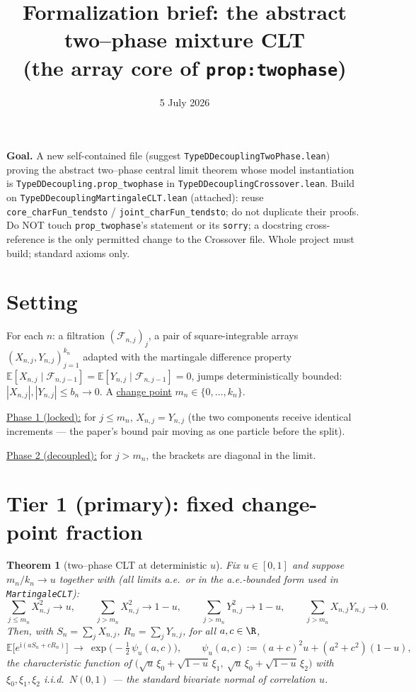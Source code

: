 \documentclass[11pt]{article}
\title{Formalization brief: the abstract two--phase mixture CLT\\
(the array core of \texttt{prop:twophase})}
\date{5 July 2026}
\theoremstyle{plain}
\newtheorem{theorem}{Theorem}
\theoremstyle{remark}
\newcommand{\E}{\mathbb{E}}\newcommand{\PP}{\mathbb{P}}
\begin{document}
\maketitle

\noindent\textbf{Goal.} A new self-contained file (suggest
\texttt{TypeDDecouplingTwoPhase.lean}) proving the abstract two--phase central
limit theorem whose model instantiation is
\texttt{TypeDDecoupling.prop\_twophase} in
\texttt{TypeDDecouplingCrossover.lean}. Build on
\texttt{TypeDDecouplingMartingaleCLT.lean} (attached): reuse
\texttt{core\_charFun\_tendsto} / \texttt{joint\_charFun\_tendsto}; do not
duplicate their proofs. Do NOT touch \texttt{prop\_twophase}'s statement or its
\texttt{sorry}; a docstring cross-reference is the only permitted change to the
Crossover file. Whole project must build; standard axioms only.

\section*{Setting}

For each $n$: a filtration $(\mathcal F_{n,j})_j$, a pair of square-integrable
arrays $(X_{n,j},Y_{n,j})_{j=1}^{k_n}$ adapted with the martingale difference
property $\E[X_{n,j}\mid\mathcal F_{n,j-1}]=\E[Y_{n,j}\mid\mathcal F_{n,j-1}]=0$,
jumps deterministically bounded: $|X_{n,j}|,|Y_{n,j}|\le b_n\to0$. A
\underline{change point} $m_n\in\{0,\dots,k_n\}$.

\underline{Phase 1 (locked):} for $j\le m_n$, $X_{n,j}=Y_{n,j}$
(the two components receive identical increments --- the paper's bound pair
moving as one particle before the split).

\underline{Phase 2 (decoupled):} for $j>m_n$, the brackets are diagonal in the
limit.

\section*{Tier 1 (primary): fixed change-point fraction}

\begin{theorem}[two--phase CLT at deterministic $u$]\label{thm:twophase-u}
Fix $u\in[0,1]$ and suppose $m_n/k_n\to u$ together with (all limits a.e.\ or
in the a.e.-bounded form used in \textup{\texttt{MartingaleCLT}}):
\[
  \sum_{j\le m_n}X_{n,j}^2\to u,\qquad
  \sum_{j>m_n}X_{n,j}^2\to 1-u,\qquad
  \sum_{j>m_n}Y_{n,j}^2\to 1-u,\qquad
  \sum_{j>m_n}X_{n,j}Y_{n,j}\to 0 .
\]
Then, with $S_n=\sum_jX_{n,j}$, $R_n=\sum_jY_{n,j}$, for all $a,c\in\R$,
\[
  \E\big[e^{\mathrm i(aS_n+cR_n)}\big]\ \longrightarrow\
  \exp\Big(-\tfrac12\,\psi_u(a,c)\Big),\qquad
  \psi_u(a,c):=(a+c)^2u+(a^2+c^2)(1-u),
\]
the characteristic function of
$\big(\sqrt u\,\xi_0+\sqrt{1-u}\,\xi_1,\ \sqrt u\,\xi_0+\sqrt{1-u}\,\xi_2\big)$
with $\xi_0,\xi_1,\xi_2$ i.i.d.\ $N(0,1)$ --- the standard bivariate normal of
correlation $u$.
\end{theorem}
\end{document}
